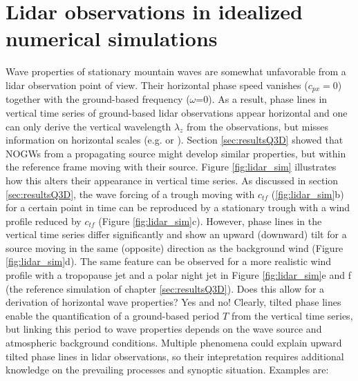 \section{Lidar observations in idealized numerical simulations}
\label{sec:lidOb-idealized}


Wave properties of stationary mountain waves are somewhat unfavorable from a lidar observation point of view. Their horizontal phase speed vanishes ($c_{px}=0$) together with the ground-based frequency ($\omega$=0). As a result, phase lines in vertical time series of ground-based lidar observations appear horizontal and one can only derive the vertical wavelength $\lambda_z$ from the observations, but misses information on horizontal scales (e.g. \cite[]{dornbrack_interpretation_2017} or \cite[]{reichert_highcadence_2021}). Section \ref{sec:resultsQ3D} showed that NOGWs from a propagating source might develop similar properties, but within the reference frame moving with their source. Figure \ref{fig:lidar_sim} illustrates how this alters their appearance in vertical time series. As discussed in section \ref{sec:resultsQ3D}, the wave forcing of a trough moving with $c_{tf}$ (\ref{fig:lidar_sim}b) for a certain point in time can be reproduced by a stationary trough with a wind profile reduced by $c_{tf}$ (Figure \ref{fig:lidar_sim}c). However, phase lines in the vertical time series differ significantly and show an upward (downward) tilt for a source moving in the same (opposite) direction as the background wind (Figure \ref{fig:lidar_sim}d). The same feature can be observed for a more realistic wind profile with a tropopause jet and a polar night jet in Figure \ref{fig:lidar_sim}e and f (the reference simulation of chapter \ref{sec:resultsQ3D}). Does this allow for a derivation of horizontal wave properties? Yes and no! Clearly, tilted phase lines enable the quantification of a ground-based period $T$ from the vertical time series, but linking this period to wave properties depends on the wave source and atmospheric background conditions. Multiple phenomena could explain upward tilted phase lines in lidar observations, so their intepretation requires additional knowledge on the prevailing processes and synoptic situation. Examples are:

